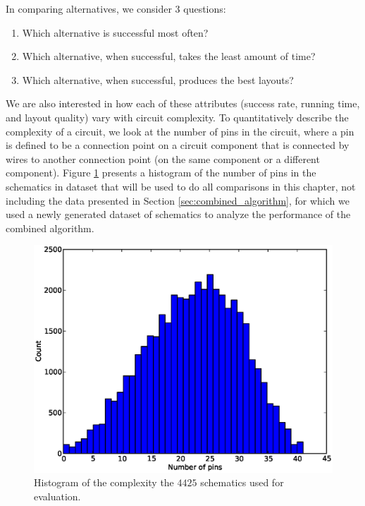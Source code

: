 In comparing alternatives, we consider $3$ questions:
\begin{enumerate}
\item Which alternative is successful most often?
\item Which alternative, when successful, takes the least amount of time?
\item Which alternative, when successful, produces the best layouts?
\end{enumerate}

We are also interested in how each of these attributes (success rate, running
time, and layout quality) vary with circuit complexity. To quantitatively
describe the complexity of a circuit, we look at the number of pins in the
circuit, where a pin is defined to be a connection point on a circuit
component that is connected by wires to another connection point (on the same
component or a different component). Figure
\ref{fig:complexity_hist} presents a histogram of the number of pins in the
schematics in dataset that will be used to do all comparisons in this chapter,
not including the data presented in Section \ref{sec:combined_algorithm}, for
which we used a newly generated dataset of schematics to analyze the performance
of the combined algorithm.

\begin{figure}[H]
\begin{center}
\includegraphics[width=\textwidth]{Images/complexity_hist.eps}
\caption{Histogram of the complexity the $4425$ schematics used for evaluation.}
\label{fig:complexity_hist}
\end{center}
\end{figure}

